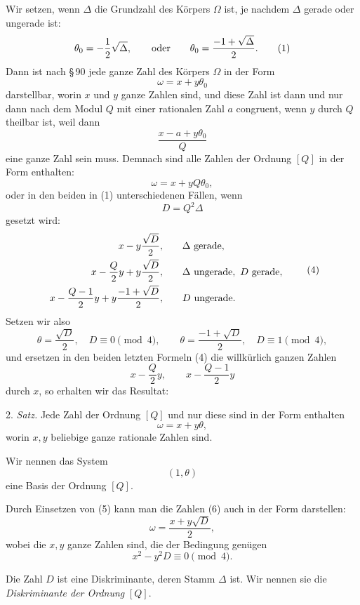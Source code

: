 \documentclass[11pt]{article}
\begin{document}
Wir setzen, wenn $\Delta$ die Grundzahl des Körpers $\Omega$ ist, je nachdem $\Delta$ gerade oder ungerade ist:
\begin{equation}
 \theta_0=-\frac{1}{2}\sqrt{\Delta},
 \qquad\hbox{oder}\qquad
 \theta_0=\frac{-1+\sqrt{\Delta}}{2}.
\tag{1}
\end{equation}
Dann ist nach \S\,90 jede ganze Zahl des Körpers $\Omega$ in der Form
\begin{equation}
 \omega=x+y\theta_0
\tag{2}
\end{equation}
darstellbar, worin $x$ und $y$ ganze Zahlen sind, und diese Zahl ist dann und nur dann nach dem Modul $Q$ mit einer rationalen Zahl $a$ congruent, wenn $y$ durch $Q$ theilbar ist, weil dann
\[
 \frac{x-a+y\theta_0}{Q}
\]
eine ganze Zahl sein muss. Demnach sind alle Zahlen der Ordnung $[Q]$ in der Form enthalten:
\[
 \omega=x+yQ\theta_0,
\]
oder in den beiden in (1) unterschiedenen Fällen, wenn
\begin{equation}
 D=Q^2\Delta
\tag{3}
\end{equation}
gesetzt wird:
\begin{equation}
\begin{array}{rll}
 x-y\dfrac{\sqrt D}{2}, && \Delta\hbox{ gerade},\\[0.7em]
 x-\dfrac{Q}{2}y+y\dfrac{\sqrt D}{2}, && \Delta\hbox{ ungerade},\ D\hbox{ gerade},\\[0.7em]
 x-\dfrac{Q-1}{2}y+y\dfrac{-1+\sqrt D}{2}, && D\hbox{ ungerade}.
\end{array}
\tag{4}
\end{equation}
Setzen wir also
\begin{equation}
 \theta=\frac{\sqrt D}{2},\quad D\equiv0\pmod4,
 \qquad
 \theta=\frac{-1+\sqrt D}{2},\quad D\equiv1\pmod4,
\tag{5}
\end{equation}
und ersetzen in den beiden letzten Formeln (4) die willkürlich ganzen Zahlen
\[
 x-\frac{Q}{2}y,
 \qquad x-\frac{Q-1}{2}y
\]
durch $x$, so erhalten wir das Resultat:

2. \emph{Satz.} Jede Zahl der Ordnung $[Q]$ und nur diese sind in der Form enthalten
\begin{equation}
 \omega=x+y\theta,
\tag{6}
\end{equation}
worin $x,y$ beliebige ganze rationale Zahlen sind.

Wir nennen das System
\begin{equation}
 (1,\theta)
\tag{7}
\end{equation}
eine Basis der Ordnung $[Q]$.

Durch Einsetzen von (5) kann man die Zahlen (6) auch in der Form darstellen:
\begin{equation}
 \omega=\frac{x+y\sqrt D}{2},
\tag{8}
\end{equation}
wobei die $x,y$ ganze Zahlen sind, die der Bedingung genügen
\begin{equation}
 x^2-y^2D\equiv0\pmod4.
\tag{9}
\end{equation}

Die Zahl $D$ ist eine Diskriminante, deren Stamm $\Delta$ ist. Wir nennen sie die \emph{Diskriminante der Ordnung} $[Q]$.
\end{document}
